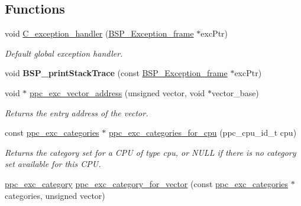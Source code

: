 \subsection*{Functions}
\begin{DoxyCompactItemize}
\item 
\mbox{\label{group__ppc__exc_ga638134c589f6bde05b3765da1eb31c02}} 
void \mbox{\hyperlink{group__ppc__exc_ga638134c589f6bde05b3765da1eb31c02}{C\+\_\+exception\+\_\+handler}} (\mbox{\hyperlink{structCPU__Exception__frame}{B\+S\+P\+\_\+\+Exception\+\_\+frame}} $\ast$exc\+Ptr)
\begin{DoxyCompactList}\small\item\em Default global exception handler. \end{DoxyCompactList}\item 
\mbox{\label{group__ppc__exc_gae37b58269b58152e4d1259d8b246644e}} 
void {\bfseries B\+S\+P\+\_\+print\+Stack\+Trace} (const \mbox{\hyperlink{structCPU__Exception__frame}{B\+S\+P\+\_\+\+Exception\+\_\+frame}} $\ast$exc\+Ptr)
\item 
void $\ast$ \mbox{\hyperlink{group__ppc__exc_ga558f37bae0f984df991c1d0ef692cf22}{ppc\+\_\+exc\+\_\+vector\+\_\+address}} (unsigned vector, void $\ast$vector\+\_\+base)
\begin{DoxyCompactList}\small\item\em Returns the entry address of the vector. \end{DoxyCompactList}\item 
\mbox{\label{group__ppc__exc_gae4f949829a12b0137eaea6142b6639db}} 
const \mbox{\hyperlink{group__ppc__exc_ga2a53861cc46267097fbb775d863a294f}{ppc\+\_\+exc\+\_\+categories}} $\ast$ \mbox{\hyperlink{group__ppc__exc_gae4f949829a12b0137eaea6142b6639db}{ppc\+\_\+exc\+\_\+categories\+\_\+for\+\_\+cpu}} (ppc\+\_\+cpu\+\_\+id\+\_\+t cpu)
\begin{DoxyCompactList}\small\item\em Returns the category set for a C\+PU of type {\itshape cpu}, or {\ttfamily N\+U\+LL} if there is no category set available for this C\+PU. \end{DoxyCompactList}\item 
\mbox{\label{group__ppc__exc_ga472a63d1c588bacaa37e4accc132600f}} 
\mbox{\hyperlink{group__ppc__exc_gab5c9ba70d9560d278d06983d7ea3babe}{ppc\+\_\+exc\+\_\+category}} \mbox{\hyperlink{group__ppc__exc_ga472a63d1c588bacaa37e4accc132600f}{ppc\+\_\+exc\+\_\+category\+\_\+for\+\_\+vector}} (const \mbox{\hyperlink{group__ppc__exc_ga2a53861cc46267097fbb775d863a294f}{ppc\+\_\+exc\+\_\+categories}} $\ast$categories, unsigned vector)

\end{DoxyCompactItemize}

